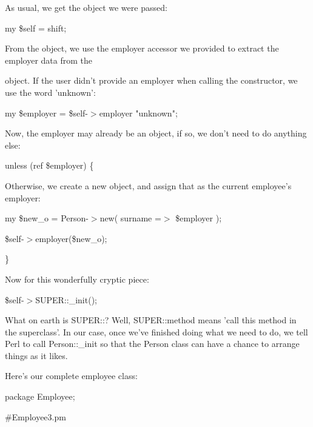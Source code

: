 \documentclass[a4paper,11pt]{book}
\begin{document}
\noindent 

\noindent 

\noindent As usual, we get the object we were passed:

\noindent 

\noindent my \$self = shift;

\noindent 

\noindent From the object, we use the employer accessor we provided to extract the employer data from the

\noindent object. If the user didn't provide an employer when calling the constructor, we use the word 'unknown':

\noindent 

\noindent my \$employer = \$self-$>$employer \textbar \textbar  "unknown";

\noindent 

\noindent Now, the employer may already be an object, if so, we don't need to do anything else:

\noindent 

\noindent unless (ref \$employer) \{

\noindent 

\noindent Otherwise, we create a new object, and assign that as the current employee's employer:

\noindent 

\noindent my \$new\_o = Person-$>$new( surname =$>$ \$employer );

\noindent \$self-$>$employer(\$new\_o);

\noindent \}

\noindent 

\noindent Now for this wonderfully cryptic piece:

\noindent 

\noindent \$self-$>$SUPER::\_init();

\noindent 

\noindent What on earth is SUPER::? Well, SUPER::method means 'call this method in the superclass'. In our case, once we've finished doing what we need to do, we tell Perl to call Person::\_init so that the Person class can have a chance to arrange things as it likes.

\noindent 

\noindent Here's our complete employee class:

\noindent 

\noindent package Employee;

\noindent \#Employee3.pm
\end{document}
